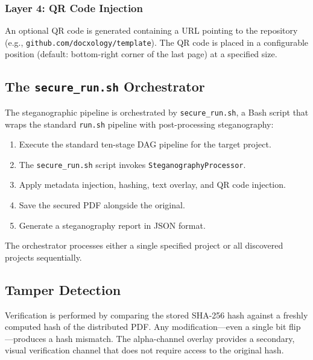 \documentclass[
]{article}
\providecommand{\tightlist}{%
  \setlength{\itemsep}{0pt}\setlength{\parskip}{0pt}}
\begin{document}
\subsubsection{Layer 4: QR Code
Injection}\label{layer-4-qr-code-injection}

An optional QR code is generated containing a URL pointing to the
repository (e.g., \texttt{github.com/docxology/template}). The QR code
is placed in a configurable position (default: bottom-right corner of
the last page) at a specified size.

\subsection{\texorpdfstring{The \texttt{secure\_run.sh}
Orchestrator}{The secure\_run.sh Orchestrator}}\label{the-secure_run.sh-orchestrator}

The steganographic pipeline is orchestrated by \texttt{secure\_run.sh},
a Bash script that wraps the standard \texttt{run.sh} pipeline with
post-processing steganography:

\begin{enumerate}
\def\labelenumi{\arabic{enumi}.}
\tightlist
\item
  Execute the standard ten-stage DAG pipeline for the target project.
\item
  The \texttt{secure\_run.sh} script invokes
  \texttt{SteganographyProcessor}.
\item
  Apply metadata injection, hashing, text overlay, and QR code
  injection.
\item
  Save the secured PDF alongside the original.
\item
  Generate a steganography report in JSON format.
\end{enumerate}

The orchestrator processes either a single specified project or all
discovered projects sequentially.

\subsection{Tamper Detection}\label{tamper-detection}

Verification is performed by comparing the stored SHA-256 hash against a
freshly computed hash of the distributed PDF. Any modification---even a
single bit flip---produces a hash mismatch. The alpha-channel overlay
provides a secondary, visual verification channel that does not require
access to the original hash.
\end{document}
